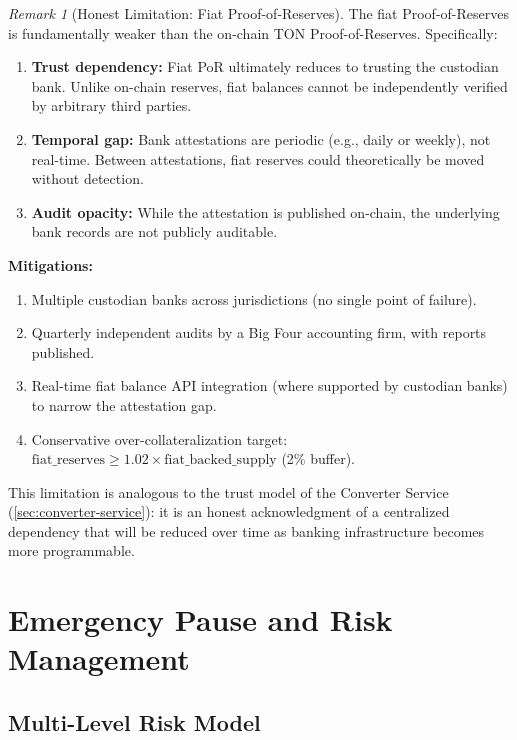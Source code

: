 \documentclass[12pt,a4paper]{article}
\theoremstyle{definition}
\theoremstyle{remark}
\newtheorem{remark}{Remark}[section]
\begin{document}
\begin{remark}[Honest Limitation: Fiat Proof-of-Reserves]
\label{rem:fiat-por-limitation}
The fiat Proof-of-Reserves is fundamentally weaker than the on-chain TON Proof-of-Reserves. Specifically:
\begin{enumerate}[nosep]
    \item \textbf{Trust dependency:} Fiat PoR ultimately reduces to trusting the custodian bank. Unlike on-chain reserves, fiat balances cannot be independently verified by arbitrary third parties.
    \item \textbf{Temporal gap:} Bank attestations are periodic (e.g., daily or weekly), not real-time. Between attestations, fiat reserves could theoretically be moved without detection.
    \item \textbf{Audit opacity:} While the attestation is published on-chain, the underlying bank records are not publicly auditable.
\end{enumerate}

\textbf{Mitigations:}
\begin{enumerate}[nosep]
    \item Multiple custodian banks across jurisdictions (no single point of failure).
    \item Quarterly independent audits by a Big Four accounting firm, with reports published.
    \item Real-time fiat balance API integration (where supported by custodian banks) to narrow the attestation gap.
    \item Conservative over-collateralization target: $\text{fiat\_reserves} \geq 1.02 \times \text{fiat\_backed\_supply}$ (2\% buffer).
\end{enumerate}

This limitation is analogous to the trust model of the Converter Service (\cref{sec:converter-service}): it is an honest acknowledgment of a centralized dependency that will be reduced over time as banking infrastructure becomes more programmable.
\end{remark}


\section{Emergency Pause and Risk Management}
\label{sec:emergency-pause}

\subsection{Multi-Level Risk Model}
\end{document}
